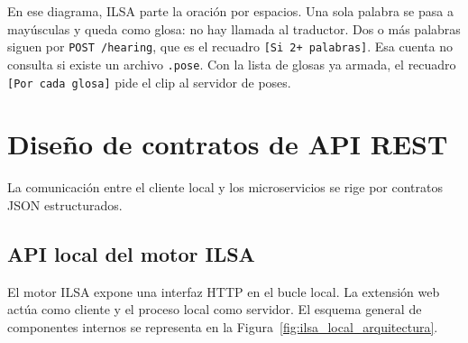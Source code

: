 En ese diagrama, ILSA parte la oración por espacios. Una sola palabra se pasa a mayúsculas y queda como glosa: no hay llamada al traductor. Dos o más palabras siguen por \texttt{POST /hearing}, que es el recuadro \texttt{[Si 2+ palabras]}. Esa cuenta no consulta si existe un archivo \texttt{.pose}. Con la lista de glosas ya armada, el recuadro \texttt{[Por cada glosa]} pide el clip al servidor de poses.

\section{Diseño de contratos de API REST}

La comunicación entre el cliente local y los microservicios se rige por contratos JSON estructurados.

\subsection{API local del motor ILSA}
El motor ILSA expone una interfaz HTTP en el bucle local. La extensión web actúa como cliente y el proceso local como servidor. El esquema general de componentes internos se representa en la Figura~\ref{fig:ilsa_local_arquitectura}.

